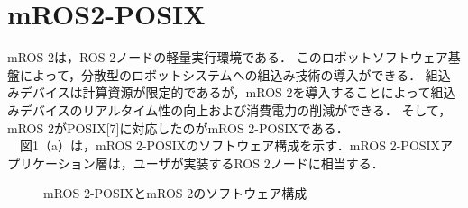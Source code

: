 \documentclass[11pt]{ujarticle}
\begin{document}
\section{mROS2-POSIX}
mROS 2は，ROS 2ノードの軽量実行環境である．
このロボットソフトウェア基盤によって，分散型のロボットシステムへの組込み技術の導入ができる．
組込みデバイスは計算資源が限定的であるが，mROS 2を導入することによって組込みデバイスのリアルタイム性の向上および消費電力の削減ができる．
そして，mROS 2がPOSIX[7]に対応したのがmROS 2-POSIXである．
\\　図1（a）は，mROS 2-POSIXのソフトウェア構成を示す．mROS 2-POSIXアプリケーション層は，ユーザが実装するROS 2ノードに相当する．
\begin{figure}[t]
	\centering
	\begin{minipage}{.5\textwidth}
		\centering
		\hfill
	\end{minipage}
	\caption{mROS 2-POSIXとmROS 2のソフトウェア構成}
	
\end{figure}
\end{document}
